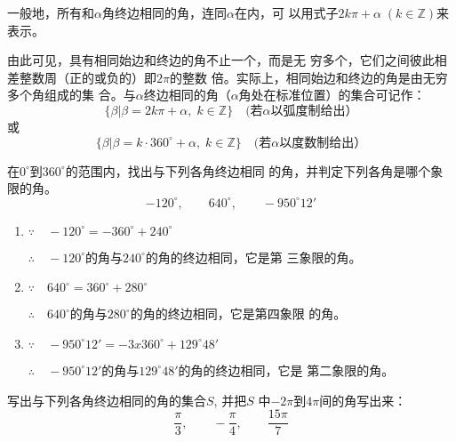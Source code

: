 一般地，所有和$\alpha$角终边相同的角，连同$\alpha$在内，可
以用式子$2k\pi+\alpha\; (k\in\mathbb{Z})$来表示。

由此可见，具有相同始边和终边的角不止一个，而是无
穷多个，它们之间彼此相差整数周（正的或负的）即$2\pi$的整数
倍。实际上，相同始边和终边的角是由无穷多个角组成的集
合。与$\alpha$终边相同的角（$\alpha$角处在标准位置）的集合可记作：
\[\{\beta|\beta=2k\pi+\alpha,\; k\in\mathbb{Z}\}\quad  \text{(若$\alpha$以弧度制给出）}\]
或
\[\{\beta|\beta=k\cdot 360^{\circ}+\alpha,\; k\in\mathbb{Z}\}\quad  \text{(若$\alpha$以度数制给出）}\]


\begin{example}
    在$0^{\circ}$到$360^{\circ}$的范围内，找出与下列各角终边相同
的角，并判定下列各角是哪个象限的角。
\[-120^{\circ},\qquad 640^{\circ},\qquad -950^{\circ}12'\]

\end{example}


\begin{solution}
\begin{enumerate}
    \item $\because\quad -120^{\circ}=-360^{\circ}+240^{\circ}$
    
$\therefore\quad -120^{\circ}$的角与$240^{\circ}$的角的终边相同，它是第
三象限的角。
\item $\because\quad 640^{\circ}=360^{\circ}+280^{\circ}$

$\therefore\quad 640^{\circ}$的角与$280^{\circ}$的角的终边相同，它是第四象限
的角。

\item $\because\quad -950^{\circ}12'=-3x360^{\circ}+129^{\circ}48'$

$\therefore\quad -950^{\circ}12'$的角与$129^{\circ}48'$的角的终边相同，它是
第二象限的角。
\end{enumerate}
\end{solution}

\begin{example}
写出与下列各角终边相同的角的集合$S$, 并把$S$
中$-2\pi$到$4\pi$间的角写出来：
\[\frac{\pi}{3},\qquad -\frac{\pi}{4},\qquad \frac{15\pi}{7}\]
\end{example}

